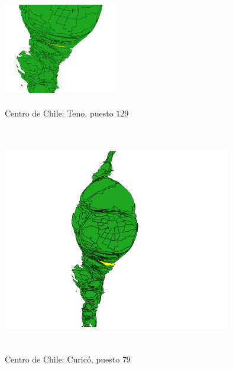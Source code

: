 \documentclass[20pt]{report}
\begin{document}
\begin{itemize}
\begin{figure}[H]
\begin{center}
\includegraphics[width=5cm, height=5cm]{teno129.png}
\vspace{-0.5cm} %
\caption{Centro de Chile: Teno, puesto $129$}
\label{Label para referencia}
\end{center}
\end{figure}

\begin{figure}[H]
\begin{center}
\includegraphics[width=10cm, height=10cm]{curico79.png}
\vspace{-0.5cm} %
\caption{Centro de Chile: Curic\'o, puesto $79$}
\label{Label para referencia}
\end{center}
\end{figure}




\end{itemize}
\end{document}
